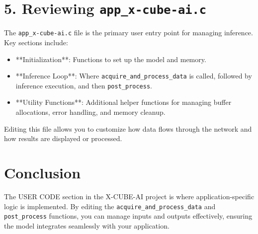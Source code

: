\documentclass{article}
\begin{document}
\section*{5. Reviewing \texttt{app\_x-cube-ai.c}}
The \texttt{app\_x-cube-ai.c} file is the primary user entry point for managing inference. Key sections include:
\begin{itemize}
    \item **Initialization**: Functions to set up the model and memory.
    \item **Inference Loop**: Where \texttt{acquire\_and\_process\_data} is called, followed by inference execution, and then \texttt{post\_process}.
    \item **Utility Functions**: Additional helper functions for managing buffer allocations, error handling, and memory cleanup.
\end{itemize}
Editing this file allows you to customize how data flows through the network and how results are displayed or processed.

\section*{Conclusion}
The USER CODE section in the X-CUBE-AI project is where application-specific logic is implemented. By editing the \texttt{acquire\_and\_process\_data} and \texttt{post\_process} functions, you can manage inputs and outputs effectively, ensuring the model integrates seamlessly with your application.
\end{document}
